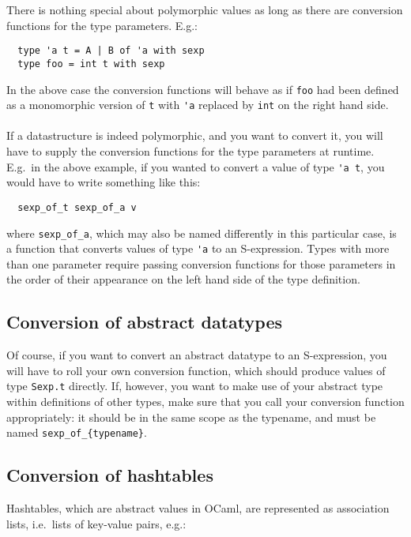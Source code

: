 \documentclass[a4paper]{article}
\begin{document}
There is nothing special about polymorphic values as long as there are
conversion functions for the type parameters.  E.g.:

\begin{verbatim}
  type 'a t = A | B of 'a with sexp
  type foo = int t with sexp
\end{verbatim}

In the above case the conversion functions will behave as if \verb=foo=
had been defined as a monomorphic version of \verb=t= with \verb='a=
replaced by \verb=int= on the right hand side.\\
\\
If a datastructure is indeed polymorphic, and you want to convert it,
you will have to supply the conversion functions for the type parameters
at runtime.  E.g.\ in the above example, if you wanted to convert a value
of type \verb='a t=, you would have to write something like this:

\begin{verbatim}
  sexp_of_t sexp_of_a v
\end{verbatim}

\noindent where \verb=sexp_of_a=, which may also be named differently in
this particular case, is a function that converts values of type \verb='a=
to an S-expression.  Types with more than one parameter require passing
conversion functions for those parameters in the order of their appearance
on the left hand side of the type definition.

\subsection{Conversion of abstract datatypes}

Of course, if you want to convert an abstract datatype to an S-expression,
you will have to roll your own conversion function, which should produce
values of type \verb=Sexp.t= directly.  If, however, you want to make
use of your abstract type within definitions of other types, make sure
that you call your conversion function appropriately: it should be in the
same scope as the typename, and must be named \verb=sexp_of_{typename}=.

\subsection{Conversion of hashtables}

Hashtables, which are abstract values in OCaml, are represented as
association lists, i.e.\ lists of key-value pairs, e.g.:
\end{document}
